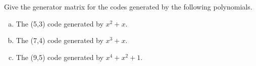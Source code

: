 \begin{exercise}
Give the generator matrix for the codes generated by the following polynomials.
\begin{enumerate}[(a)]
\item The (5,3) code generated by $x^2 + x$.
\item The (7,4) code generated by $x^3 + x $.
\item The (9,5) code generated by $x^4 + x^2 + 1$.
\end{enumerate}
\end{exercise}

%
%
%
%
%
%

